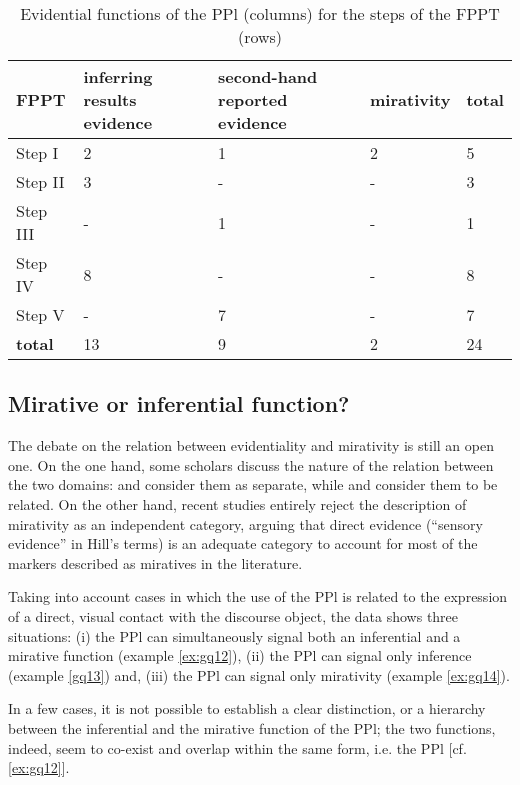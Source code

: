 \documentclass[output=paper]{langsci/langscibook}
\begin{document}
\begin{table}
\begin{tabularx}{\textwidth}{XXXXX}
\hline
 \textbf{FPPT} & \textbf{inferring results evidence} & \textbf{second-hand reported evidence} & \textbf{mirativity} & \textbf{total}\\
\hline
Step I & 2 & 1 & 2 & 5\\
Step II & 3 & {-} & {-} & 3\\
Step III & {-} & 1 & {-} & 1\\
Step IV & 8 & {-} & {-} & 8\\
Step V & {-} & 7 & {-} & 7\\
\hline
\textbf{total} & 13 & 9 & 2 & 24\\
\hline
\end{tabularx}
\caption{Evidential functions of the PPl (columns) for the steps of the FPPT (rows)}\label{tab:gq2}
\end{table}


\subsection{Mirative or inferential function?}\label{s:gq4-1}

The debate on the relation between evidentiality and mirativity is still an open one. On the one hand, some scholars discuss the nature of the relation between the two domains: \citet{DeLancey1997} and \citet{Aikhenvald2004} consider them as separate, while \citet{Lazard1999} and \citet{Haan2012} consider them to be related. On the other hand, recent studies \citep{Hill2012} entirely reject the description of mirativity as an independent category, arguing that direct evidence (“sensory evidence” in Hill’s terms) is an adequate category to account for most of the markers described as miratives in the literature. 

Taking into account cases in which the use of the PPl is related to the expression of a direct, visual contact with the discourse object, the data shows three situations: (i) the PPl can simultaneously signal both an inferential and a mirative function (example \ref{ex:gq12}), (ii) the PPl can signal only inference (example \ref{gq13}) and, (iii) the PPl can signal only mirativity (example \ref{ex:gq14}).

In a few cases, it is not possible to establish a clear distinction, or a hierarchy between the inferential \citep{Willett1988} and the mirative function of the PPl; the two functions, indeed, seem to co-exist and overlap within the same form, i.e. the PPl [cf. \ref{ex:gq12}]. 
\end{document}
